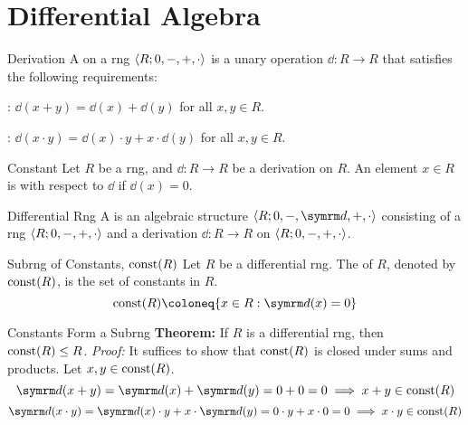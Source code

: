 
\chapter{Differential Algebra}

\begin{dfnbox}{Derivation}
	A  on a rng ${\langle {R; 0, -, +, \cdot} \rangle}$ is a unary operation $\dd: R \to R$ that satisfies the following requirements:
	\begin{dfnitems}
		\item {}: $\dd(x + y) = \dd(x) + \dd(y)$ for all $x, y \in R$.
		\item {}: $\dd(x \cdot y) = \dd(x) \cdot y + x \cdot \dd(y)$ for all $x, y \in R$.
	\end{dfnitems}
\end{dfnbox}

\begin{dfnbox}{Constant}
	Let $R$ be a rng, and $\dd: R \to R$ be a derivation on $R$. An element $x \in R$ is  with respect to $\dd$ if $\dd(x) = 0$.
\end{dfnbox}

\begin{dfnbox}{Differential Rng}
	A  is an algebraic structure $\alg{R; 0, -, \dd, +, \cdot}$ consisting of a rng ${\langle {R; 0, -, +, \cdot} \rangle}$ and a derivation $\dd: R \to R$ on ${\langle {R; 0, -, +, \cdot} \rangle}$.
\end{dfnbox}

\begin{dfnbox}{Subrng of Constants, $\operatorname{const}(R)$}
	Let $R$ be a differential rng. The  of $R$, denoted by $\operatorname{const}(R)$, is the set of constants in $R$.
	\[ \const(R) \coloneq \{ x \in R : \dd(x) = 0 \} \]
\end{dfnbox}

\begin{thmbox}{Constants Form a Subrng}
	\textbf{Theorem:} If $R$ is a differential rng, then $\operatorname{const}(R) \le R$.
	\tcblower
	\textit{Proof:} It suffices to show that $\operatorname{const}(R)$ is closed under sums and products. Let $x, y \in \operatorname{const}(R)$.
	\[ \dd(x + y) = \dd(x) + \dd(y) = 0 + 0 = 0 \implies x + y \in \const(R) \]
	\[ \dd(x \cdot y) = \dd(x) \cdot y + x \cdot \dd(y) = 0 \cdot y + x \cdot 0 = 0 \implies x \cdot y \in \const(R) \]
\end{thmbox}


